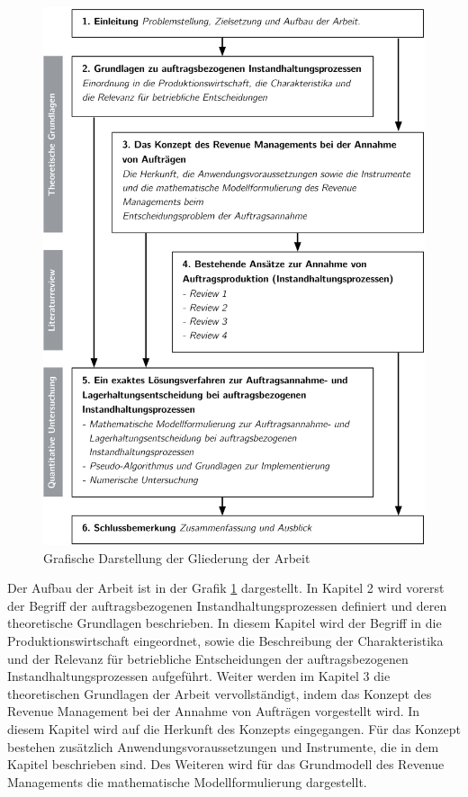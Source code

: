 \begin{figure}[h!]
  \begin{center}
    \includegraphics[width=140mm]{Bilder/Gliederung.pdf}
    \caption{Grafische Darstellung der Gliederung der Arbeit}  \label{Gliederung}
  \end{center}
\end{figure}


Der Aufbau der Arbeit ist in der Grafik \ref{Gliederung} dargestellt. In Kapitel 2 wird vorerst der Begriff der auftragsbezogenen Instandhaltungsprozessen definiert und deren theoretische Grundlagen beschrieben. In diesem Kapitel wird der Begriff in die Produktionswirtschaft eingeordnet, sowie die Beschreibung der Charakteristika und der Relevanz für betriebliche Entscheidungen der auftragsbezogenen Instandhaltungsprozessen aufgeführt. Weiter werden im Kapitel 3 die theoretischen Grundlagen der Arbeit vervollständigt, indem das Konzept des Revenue Management bei der Annahme von Aufträgen vorgestellt wird. In diesem Kapitel wird auf die Herkunft des Konzepts eingegangen. Für das Konzept bestehen zusätzlich Anwendungsvoraussetzungen und Instrumente, die in dem Kapitel beschrieben sind. Des Weiteren wird für das Grundmodell des Revenue Managements die mathematische Modellformulierung dargestellt.

